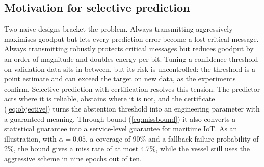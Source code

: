 \subsection{Motivation for selective prediction}
Two naive designs bracket the problem. Always transmitting aggressively maximises goodput but lets every prediction error become a lost critical message. Always transmitting robustly protects critical messages but reduces goodput by an order of magnitude and doubles energy per bit. Tuning a confidence threshold on validation data sits in between, but its risk is uncontrolled: the threshold is a point estimate and can exceed the target on new data, as the experiments confirm. Selective prediction with certification resolves this tension. The predictor acts where it is reliable, abstains where it is not, and the certificate (\ref{eq:objective}) turns the abstention threshold into an engineering parameter with a guaranteed meaning. Through bound (\ref{eq:missbound}) it also converts a statistical guarantee into a service-level guarantee for maritime IoT. As an illustration, with $\alpha=0.05$, a coverage of 90\% and a fallback failure probability of 2\%, the bound gives a miss rate of at most 4.7\%, while the vessel still uses the aggressive scheme in nine epochs out of ten.

